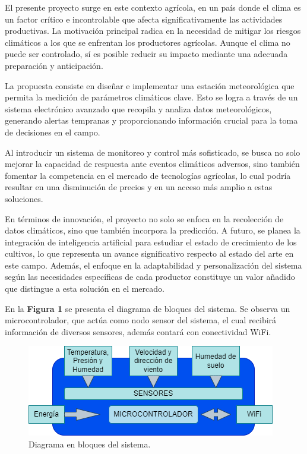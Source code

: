 \documentclass[
11pt, %
]{charter}
\begin{document}
El presente proyecto surge en este contexto agrícola, en un país donde el clima es un factor crítico e incontrolable que afecta significativamente las actividades productivas. La motivación principal radica en la necesidad de mitigar los riesgos climáticos a los que se enfrentan los productores agrícolas. Aunque el clima no puede ser controlado, sí es posible reducir su impacto mediante una adecuada preparación y anticipación.

La propuesta consiste en diseñar e implementar una estación meteorológica que permita la medición de parámetros climáticos clave. Esto se logra a través de un sistema electrónico avanzado que recopila y analiza datos meteorológicos, generando alertas tempranas y proporcionando información crucial para la toma de decisiones en el campo.

Al introducir un sistema de monitoreo y control más sofisticado, se busca no solo mejorar la capacidad de respuesta ante eventos climáticos adversos, sino también fomentar la competencia en el mercado de tecnologías agrícolas, lo cual podría resultar en una disminución de precios y en un acceso más amplio a estas soluciones.

En términos de innovación, el proyecto no solo se enfoca en la recolección de datos climáticos, sino que también incorpora la predicción. A futuro, se planea la integración de inteligencia artificial para estudiar el estado de crecimiento de los cultivos, lo que representa un avance significativo respecto al estado del arte en este campo. Además, el enfoque en la adaptabilidad y personalización del sistema según las necesidades específicas de cada productor constituye un valor añadido que distingue a esta solución en el mercado.

En la \textbf{Figura 1} se presenta el diagrama de bloques del sistema. Se observa un microcontrolador, que actúa como nodo sensor del sistema, el cual recibirá información de diversos sensores, además contará con conectividad WiFi.

\begin{figure}[htpb]
\centering 
\includegraphics[width=.85\textwidth]{./Figuras/projectDiagram1.png}
\caption{Diagrama en bloques del sistema.}
\label{fig:diagBloques}
\end{figure}
\end{document}
